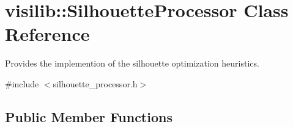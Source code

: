 \hypertarget{classvisilib_1_1_silhouette_processor}{}\section{visilib\+::Silhouette\+Processor Class Reference}
\label{classvisilib_1_1_silhouette_processor}


Provides the implemention of the silhouette optimization heuristics. 




{\ttfamily \#include $<$silhouette\+\_\+processor.\+h$>$}

\subsection*{Public Member Functions}
